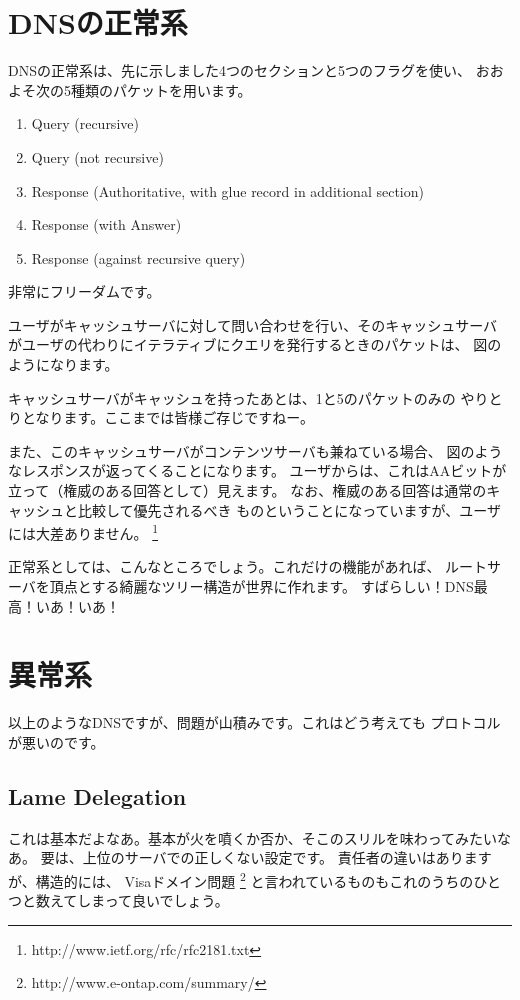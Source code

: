 \section {DNSの正常系}

DNSの正常系は、先に示しました4つのセクションと5つのフラグを使い、
おおよそ次の5種類のパケットを用います。
\begin{enumerate}
  \item Query (recursive)
  \item Query (not recursive)
  \item Response (Authoritative, with glue record in additional section)
  \item Response (with Answer)
  \item Response (against recursive query)
\end{enumerate}
非常にフリーダムです。

ユーザがキャッシュサーバに対して問い合わせを行い、そのキャッシュサーバ
がユーザの代わりにイテラティブにクエリを発行するときのパケットは、
図のようになります。

キャッシュサーバがキャッシュを持ったあとは、1と5のパケットのみの
やりとりとなります。ここまでは皆様ご存じですねー。

また、このキャッシュサーバがコンテンツサーバも兼ねている場合、
図のようなレスポンスが返ってくることになります。
ユーザからは、これはAAビットが立って（権威のある回答として）見えます。
なお、権威のある回答は通常のキャッシュと比較して優先されるべき
ものということになっていますが、ユーザには大差ありません。
\footnote{http://www.ietf.org/rfc/rfc2181.txt}

正常系としては、こんなところでしょう。これだけの機能があれば、
ルートサーバを頂点とする綺麗なツリー構造が世界に作れます。
すばらしい！DNS最高！いあ！いあ！


\section { 異常系 }
以上のようなDNSですが、問題が山積みです。これはどう考えても
プロトコルが悪いのです。

\subsection{ Lame Delegation }
これは基本だよなあ。基本が火を噴くか否か、そこのスリルを味わってみたいなあ。
要は、上位のサーバでの正しくない設定です。
責任者の違いはありますが、構造的には、 Visaドメイン問題 
\footnote{http://www.e-ontap.com/summary/}
と言われているものもこれのうちのひとつと数えてしまって良いでしょう。


